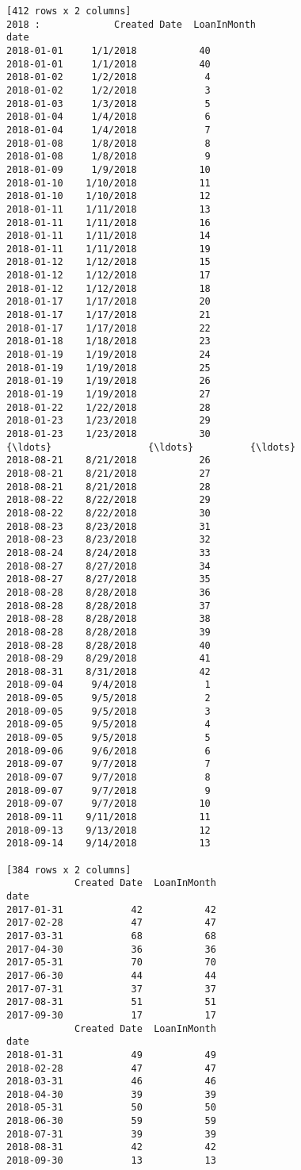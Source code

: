 \documentclass[11pt]{article}
\begin{document}
\begin{Verbatim}[commandchars=\\\{\}]
[412 rows x 2 columns]
2018 :             Created Date  LoanInMonth
date                                
2018-01-01     1/1/2018           40
2018-01-01     1/1/2018           40
2018-01-02     1/2/2018            4
2018-01-02     1/2/2018            3
2018-01-03     1/3/2018            5
2018-01-04     1/4/2018            6
2018-01-04     1/4/2018            7
2018-01-08     1/8/2018            8
2018-01-08     1/8/2018            9
2018-01-09     1/9/2018           10
2018-01-10    1/10/2018           11
2018-01-10    1/10/2018           12
2018-01-11    1/11/2018           13
2018-01-11    1/11/2018           16
2018-01-11    1/11/2018           14
2018-01-11    1/11/2018           19
2018-01-12    1/12/2018           15
2018-01-12    1/12/2018           17
2018-01-12    1/12/2018           18
2018-01-17    1/17/2018           20
2018-01-17    1/17/2018           21
2018-01-17    1/17/2018           22
2018-01-18    1/18/2018           23
2018-01-19    1/19/2018           24
2018-01-19    1/19/2018           25
2018-01-19    1/19/2018           26
2018-01-19    1/19/2018           27
2018-01-22    1/22/2018           28
2018-01-23    1/23/2018           29
2018-01-23    1/23/2018           30
{\ldots}                 {\ldots}          {\ldots}
2018-08-21    8/21/2018           26
2018-08-21    8/21/2018           27
2018-08-21    8/21/2018           28
2018-08-22    8/22/2018           29
2018-08-22    8/22/2018           30
2018-08-23    8/23/2018           31
2018-08-23    8/23/2018           32
2018-08-24    8/24/2018           33
2018-08-27    8/27/2018           34
2018-08-27    8/27/2018           35
2018-08-28    8/28/2018           36
2018-08-28    8/28/2018           37
2018-08-28    8/28/2018           38
2018-08-28    8/28/2018           39
2018-08-28    8/28/2018           40
2018-08-29    8/29/2018           41
2018-08-31    8/31/2018           42
2018-09-04     9/4/2018            1
2018-09-05     9/5/2018            2
2018-09-05     9/5/2018            3
2018-09-05     9/5/2018            4
2018-09-05     9/5/2018            5
2018-09-06     9/6/2018            6
2018-09-07     9/7/2018            7
2018-09-07     9/7/2018            8
2018-09-07     9/7/2018            9
2018-09-07     9/7/2018           10
2018-09-11    9/11/2018           11
2018-09-13    9/13/2018           12
2018-09-14    9/14/2018           13

[384 rows x 2 columns]
            Created Date  LoanInMonth
date                                 
2017-01-31            42           42
2017-02-28            47           47
2017-03-31            68           68
2017-04-30            36           36
2017-05-31            70           70
2017-06-30            44           44
2017-07-31            37           37
2017-08-31            51           51
2017-09-30            17           17
            Created Date  LoanInMonth
date                                 
2018-01-31            49           49
2018-02-28            47           47
2018-03-31            46           46
2018-04-30            39           39
2018-05-31            50           50
2018-06-30            59           59
2018-07-31            39           39
2018-08-31            42           42
2018-09-30            13           13


\end{Verbatim}
\end{document}
